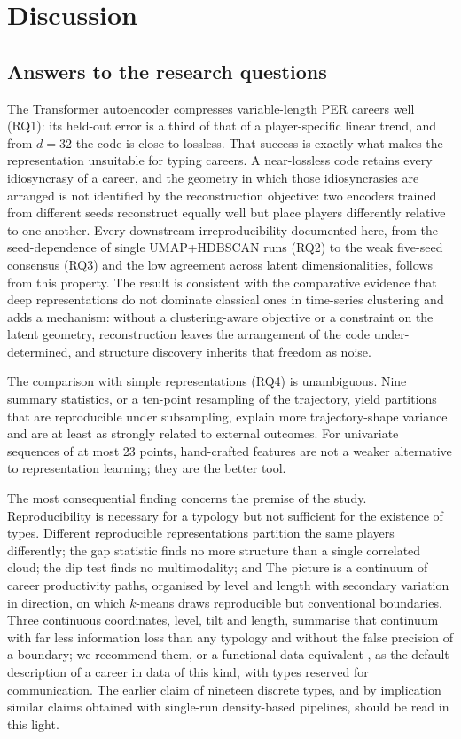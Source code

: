 \section{Discussion}\label{sec:discussion}

\subsection{Answers to the research questions}

The Transformer autoencoder compresses variable-length PER careers well (RQ1): its held-out error is a third of that of a player-specific linear trend, and from $d=32$ the code is close to lossless. That success is exactly what makes the representation unsuitable for typing careers. A near-lossless code retains every idiosyncrasy of a career, and the geometry in which those idiosyncrasies are arranged is not identified by the reconstruction objective: two encoders trained from different seeds reconstruct equally well but place players differently relative to one another. Every downstream irreproducibility documented here, from the seed-dependence of single UMAP+HDBSCAN runs (RQ2) to the weak five-seed consensus (RQ3) and the low agreement across latent dimensionalities, follows from this property. The result is consistent with the comparative evidence that deep representations do not dominate classical ones in time-series clustering \citep{lafabregue2022} and adds a mechanism: without a clustering-aware objective \citep{ma2019} or a constraint on the latent geometry, reconstruction leaves the arrangement of the code under-determined, and structure discovery inherits that freedom as noise.

The comparison with simple representations (RQ4) is unambiguous. Nine summary statistics, or a ten-point resampling of the trajectory, yield partitions that are reproducible under subsampling, explain more trajectory-shape variance and are at least as strongly related to external outcomes. For univariate sequences of at most 23 points, hand-crafted features are not a weaker alternative to representation learning; they are the better tool.

The most consequential finding concerns the premise of the study. Reproducibility is necessary for a typology but not sufficient for the existence of types. Different reproducible representations partition the same players differently; the gap statistic finds no more structure than a single correlated cloud; the dip test finds no multimodality; and \nullDiscussion{} The picture is a continuum of career productivity paths, organised by level and length with secondary variation in direction, on which $k$-means draws reproducible but conventional boundaries. Three continuous coordinates, level, tilt and length, summarise that continuum with far less information loss than any typology and without the false precision of a boundary; we recommend them, or a functional-data equivalent \citep{wakim2014,elijah2025}, as the default description of a career in data of this kind, with types reserved for communication. The earlier claim of nineteen discrete types, and by implication similar claims obtained with single-run density-based pipelines, should be read in this light.

